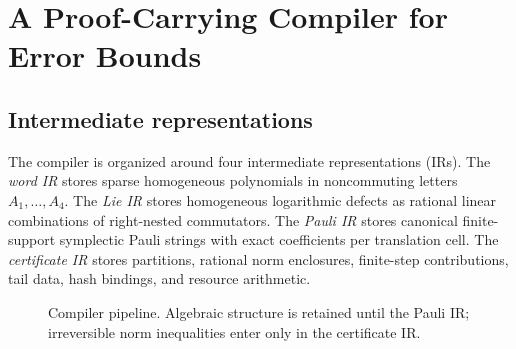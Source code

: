 \section{A Proof-Carrying Compiler for Error Bounds}
\label{sec:compiler}

\subsection{Intermediate representations}

The compiler is organized around four intermediate representations (IRs).
The \emph{word IR} stores sparse homogeneous polynomials in noncommuting
letters $A_1,\ldots,A_4$.  The \emph{Lie IR} stores homogeneous logarithmic
defects as rational linear combinations of right-nested commutators.  The
\emph{Pauli IR} stores canonical finite-support symplectic Pauli strings with
exact coefficients per translation cell.  The \emph{certificate IR} stores
partitions, rational norm enclosures, finite-step contributions, tail data,
hash bindings, and resource arithmetic.

\begin{figure}[t]
\centering
{}
\caption{Compiler pipeline.  Algebraic structure is retained until the Pauli
IR; irreversible norm inequalities enter only in the certificate IR.}
\label{fig:pipeline}
\end{figure}

